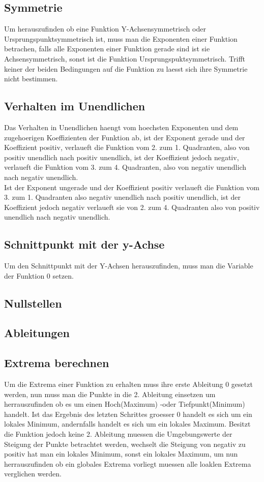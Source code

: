 \documentclass[a4paper]{article} %
\begin{document}
	\subsection{Symmetrie}
	Um herauszufinden ob eine Funktion Y-Achsensymmetrisch oder Ursprungspunktsymmetrisch ist, muss man die Exponenten einer Funktion betrachen, falls alle Exponenten einer Funktion gerade sind ist sie Achsensymmetrisch, sonst ist die Funktion Ursprungspuktsymmetrisch. Trifft keiner der beiden Bedingungen auf die Funktion zu laesst sich ihre Symmetrie nicht bestimmen.
	\subsection{Verhalten im Unendlichen}
	Das Verhalten in Unendlichen haengt vom hoechsten Exponenten und dem zugehoerigen Koeffizienten der Funktion ab, ist der Exponent gerade und der Koeffizient positiv, verlaueft die Funktion vom 2. zum 1. Quadranten, also von positiv unendlich nach positiv unendlich, ist der Koeffizient jedoch negativ, verlaueft die Funktion vom 3. zum 4. Quadranten, also von negativ unendlich nach negativ unendlich.\\
	Ist der Exponent ungerade und der Koeffizient positiv verlaueft die Funktion vom 3. zum 1. Quadranten also negativ unendlich nach positiv unendlich, ist der Koeffizient jedoch negativ verlaueft sie von 2. zum 4. Quadranten also von positiv unendlich nach negativ unendlich.
	\subsection{Schnittpunkt mit der y-Achse}
	Um den Schnittpunkt mit der Y-Achsen herauszufinden, muss man die Variable der Funktion 0 setzen.
	\subsection{Nullstellen}
	\subsection{Ableitungen}
	\subsection{Extrema berechnen}
	Um die Extrema einer Funktion zu erhalten muss ihre erste Ableitung 0 gesetzt werden, nun muss man die Punkte in die 2. Ableitung 
	einsetzen um herrauszufinden ob es um einen Hoch(Maximum) -oder Tiefpunkt(Minimum) handelt. Ist das Ergebnis des letzten Schrittes groesser 0
	handelt es sich um ein lokales Minimum, andernfalls handelt es sich um ein lokales Maximum. Besitzt die Funktion jedoch keine 2. Ableitung muessen die Umgebungswerte der Steigung der Punkte betrachtet werden, wechselt die Steigung von negativ zu positiv hat man ein lokales  Minimum, sonst ein lokales Maximum, um nun herrauszufinden ob ein globales Extrema vorliegt muessen alle loaklen Extrema verglichen werden.
\end{document}
